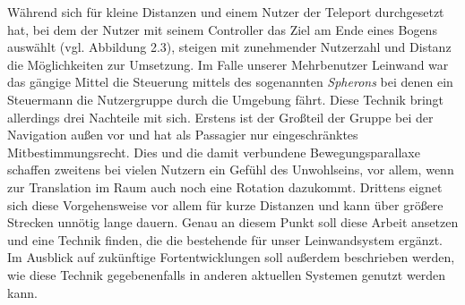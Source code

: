 Während sich für kleine Distanzen und einem Nutzer der Teleport durchgesetzt hat, bei dem der Nutzer mit seinem Controller das Ziel am Ende eines Bogens auswählt (vgl. Abbildung 2.3), steigen mit zunehmender Nutzerzahl und Distanz die Möglichkeiten zur Umsetzung.
Im Falle unserer Mehrbenutzer Leinwand war das gängige Mittel die Steuerung mittels des sogenannten \textit{Spherons} bei denen ein Steuermann die Nutzergruppe durch die Umgebung \glqq fährt\grqq{}.
Diese Technik bringt allerdings drei Nachteile mit sich. Erstens ist der Großteil der Gruppe bei der Navigation außen vor und hat als Passagier nur eingeschränktes Mitbestimmungsrecht. Dies und die damit verbundene Bewegungsparallaxe schaffen zweitens bei vielen Nutzern ein Gefühl des Unwohlseins, vor allem, wenn zur Translation im Raum auch noch eine Rotation dazukommt. Drittens eignet sich diese Vorgehensweise vor allem für kurze Distanzen und kann über größere Strecken unnötig lange dauern.
Genau an diesem Punkt soll diese Arbeit ansetzen und eine Technik finden, die die bestehende für unser Leinwandsystem ergänzt. Im Ausblick auf zukünftige Fortentwicklungen soll außerdem beschrieben werden, wie diese Technik gegebenenfalls in anderen aktuellen Systemen genutzt werden kann.